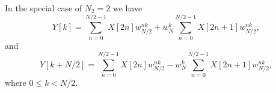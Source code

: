 \begin{remark}
In the special case of $N_2=2$ we have
\[
  Y[k] = \sum_{n=0}^{N/2-1} X[2n]w_{N/2}^{nk} 
              + w_{N}^k \sum_{n=0}^{N/2-1} X[2n+1]w_{N/2}^{nk},
\]
and 
\[
  Y[k+N/2] = \sum_{n=0}^{N/2-1} X[2n]w_{N/2}^{nk} 
              - w_{N}^k \sum_{n=0}^{N/2-1} X[2n+1]w_{N/2}^{nk},
\]
where $0\le k<N/2$.
\end{remark}
